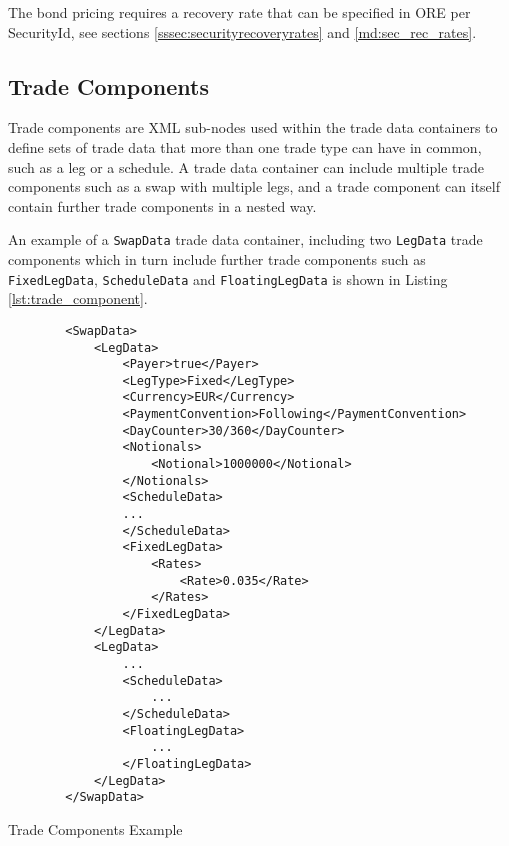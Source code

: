 The bond pricing requires a recovery rate that can be specified in ORE per SecurityId, see sections \ref{sssec:securityrecoveryrates} and \ref{md:sec_rec_rates}. 

\subsection{Trade Components}

Trade components are XML sub-nodes used within the trade data containers to define sets of trade data that more than one
trade type can have in common, such as a leg or a schedule. A trade data container can include multiple trade components
such as a swap with multiple legs, and a trade component can itself contain further trade components in a nested way.

\vspace{1em}

An example of a \lstinline!SwapData! trade data container, including two \lstinline!LegData! trade components which in
turn include further trade components such as \lstinline!FixedLegData!, \lstinline!ScheduleData! and
\lstinline!FloatingLegData! is shown in Listing \ref{lst:trade_component}.

\begin{listing}[H]
\begin{verbatim}
        <SwapData>
            <LegData>
                <Payer>true</Payer>
                <LegType>Fixed</LegType>
                <Currency>EUR</Currency>
                <PaymentConvention>Following</PaymentConvention>
                <DayCounter>30/360</DayCounter>
                <Notionals>
                    <Notional>1000000</Notional>
                </Notionals>
                <ScheduleData>
                ...
                </ScheduleData>
                <FixedLegData>
                    <Rates>
                        <Rate>0.035</Rate>
                    </Rates>
                </FixedLegData>
            </LegData>
            <LegData>
                ...
                <ScheduleData>
                    ...
                </ScheduleData>
                <FloatingLegData>
                    ...
                </FloatingLegData>
            </LegData>
        </SwapData>
\end{verbatim}
\caption{Trade Components Example}
\label{lst:trade_component}
\end{listing}

